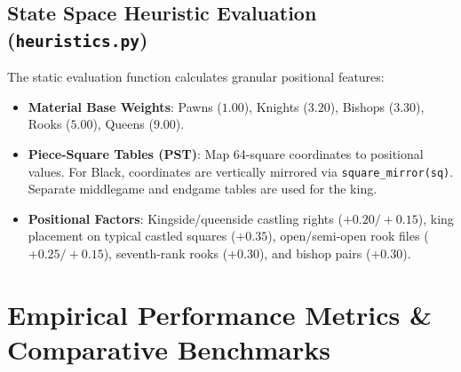 \documentclass[11pt,a4paper]{article}
\begin{document}
\subsection{State Space Heuristic Evaluation (\texttt{heuristics.py})}
The static evaluation function calculates granular positional features:
\begin{itemize}[leftmargin=*]
    \item \textbf{Material Base Weights}: Pawns ($1.00$), Knights ($3.20$), Bishops ($3.30$), Rooks ($5.00$), Queens ($9.00$).
    \item \textbf{Piece-Square Tables (PST)}: Map 64-square coordinates to positional values. For Black, coordinates are vertically mirrored via \texttt{square\_mirror(sq)}. Separate middlegame and endgame tables are used for the king.
    \item \textbf{Positional Factors}: Kingside/queenside castling rights ($+0.20/+0.15$), king placement on typical castled squares ($+0.35$), open/semi-open rook files ($+0.25/+0.15$), seventh-rank rooks ($+0.30$), and bishop pairs ($+0.30$).
\end{itemize}
\section{Empirical Performance Metrics \& Comparative Benchmarks}
\end{document}
